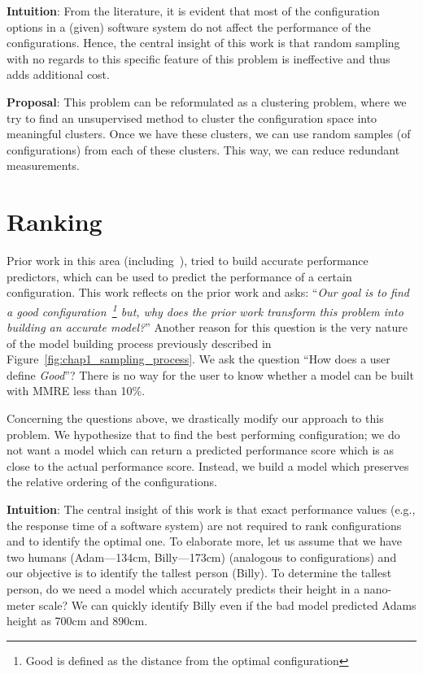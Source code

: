 \noindent\textbf{Intuition}: From the literature, it is evident that most of the configuration options in a (given) software system do not affect the performance of the configurations. Hence, the central insight of this work is that random sampling with no regards to this specific feature of this problem is ineffective and thus adds additional cost. 

\noindent\textbf{Proposal}: This problem can be reformulated as a clustering problem, where we try to find an unsupervised method to cluster the configuration space into meaningful clusters. Once we have these clusters, we can use random samples (of configurations) from each of these clusters. This way, we can reduce redundant measurements.  

\section{Ranking}
Prior work in this area (including~\cite{nair2017faster}), tried to build accurate performance predictors, which can be used to predict the performance of a certain configuration. This work reflects on the prior work and asks: ``\textit{Our goal is to find a good configuration~\footnote{Good is defined as the distance from the optimal configuration} but, why does the prior work transform this problem into building an accurate model?}'' Another reason for this question is the very nature of the model building process previously described in Figure~\ref{fig:chap1_sampling_process}. We ask the question ``How does a user define \textit{Good}''? There is no way for the user to know whether a model can be built with MMRE less than 10\%. 

Concerning the questions above, we drastically modify our approach to this problem. We hypothesize that to find the best performing configuration; we do not want a model which can return a predicted performance score which is as close to the actual performance score. Instead, we build a model which preserves the relative ordering of the configurations. 

\noindent\textbf{Intuition}: The central insight of this work is that exact performance values (e.g., the response time of a software system) are not required to rank configurations and to identify the optimal one. To elaborate more, let us assume that we have two humans (Adam---134cm, Billy---173cm) (analogous to configurations) and our objective is to identify the tallest person (Billy). To determine the tallest person, do we need a model which accurately predicts their height in a nano-meter scale? We can quickly identify Billy even if the bad model predicted Adams height as 700cm and 890cm. 

